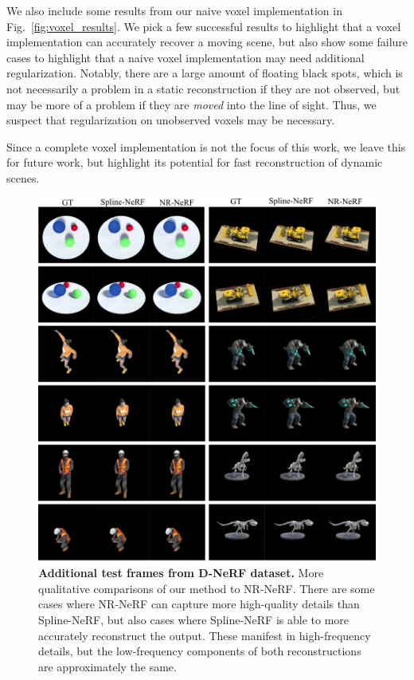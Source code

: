 \documentclass[runningheads]{llncs}
\begin{document}
We also include some results from our naive voxel implementation in Fig.~\ref{fig:voxel_results}. We pick a few successful results to highlight that a voxel implementation can accurately recover a moving scene, but also show some failure cases to highlight that a naive voxel implementation may need additional regularization. Notably, there are a large amount of floating black spots, which is not necessarily a problem in a static reconstruction if they are not observed, but may be more of a problem if they are \textit{moved} into the line of sight. Thus, we suspect that regularization on unobserved voxels may be necessary.

Since a complete voxel implementation is not the focus of this work, we leave this for future work, but highlight its potential for fast reconstruction of dynamic scenes.





\begin{figure}
    \centering
    \includegraphics[width=\textwidth]{additional_results}
    \caption{
        \label{fig:dnerf_more}
        \textbf{Additional test frames from D-NeRF dataset.} More qualitative comparisons of our method to NR-NeRF. There are some cases where NR-NeRF can capture more high-quality details than Spline-NeRF, but also cases where Spline-NeRF is able to more accurately reconstruct the output. These manifest in high-frequency details, but the low-frequency components of both reconstructions are approximately the same.
    }
\end{figure}
\end{document}
